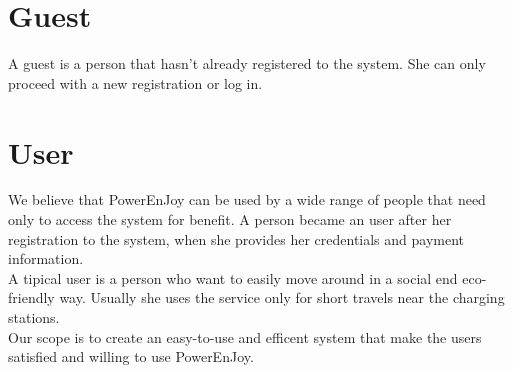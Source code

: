 \section{Guest}
A guest is a person that hasn't already registered to the system. She can only proceed with a new registration or log in.
\section{User}
We believe that PowerEnJoy can be used by a wide range of people that need only to access the system for benefit. A person became an user after her registration to the system, when she provides her credentials and payment information. 
\\A tipical user is a person who want to easily move around in a social end eco-friendly way. Usually she uses the service only for short travels near the \Glspl{charging station}.
\\Our scope is to create an easy-to-use and efficent system that make the users satisfied and willing to use PowerEnJoy.

